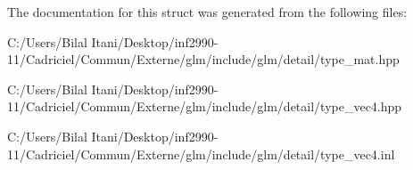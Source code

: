 The documentation for this struct was generated from the following files\+:\begin{DoxyCompactItemize}
\item 
C\+:/\+Users/\+Bilal Itani/\+Desktop/inf2990-\/11/\+Cadriciel/\+Commun/\+Externe/glm/include/glm/detail/type\+\_\+mat.\+hpp\item 
C\+:/\+Users/\+Bilal Itani/\+Desktop/inf2990-\/11/\+Cadriciel/\+Commun/\+Externe/glm/include/glm/detail/type\+\_\+vec4.\+hpp\item 
C\+:/\+Users/\+Bilal Itani/\+Desktop/inf2990-\/11/\+Cadriciel/\+Commun/\+Externe/glm/include/glm/detail/type\+\_\+vec4.\+inl\end{DoxyCompactItemize}
